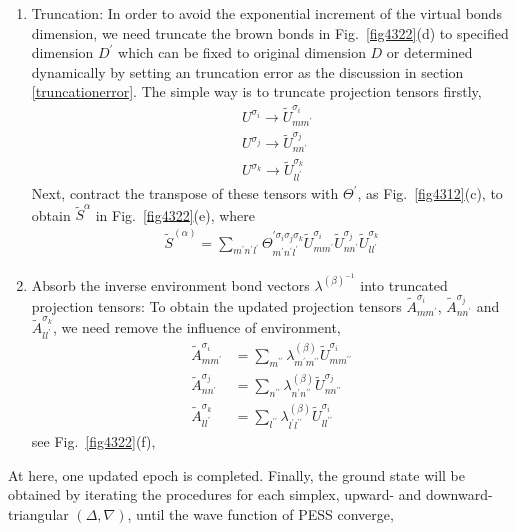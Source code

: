\begin{enumerate}
	\item Truncation: In order to avoid the exponential increment of the virtual bonds dimension, we need truncate the brown bonds in Fig.~\ref{fig4322}(d) to specified dimension $D^{\prime}$ which can be fixed to original dimension $D$ or determined dynamically by setting an truncation error as the discussion in section \ref{truncationerror}. The simple way is to truncate projection tensors firstly,  
		\begin{align}
			&U^{\sigma_i} \rightarrow \widetilde{U}^{\sigma_i}_{mm^{\prime}} \\
			&U^{\sigma_j} \rightarrow \widetilde{U}^{\sigma_j}_{nn^{\prime}} \\
			&U^{\sigma_k} \rightarrow \widetilde{U}^{\sigma_k}_{ll^{\prime}}
		\end{align}
		Next, contract the transpose of these tensors with $\Theta^{\prime}$, as Fig.~\ref{fig4312}(c), to obtain $\widetilde{S}^{\alpha}$ in Fig.~\ref{fig4322}(e), where
		\begin{align}
			\widetilde{S}^{(\alpha)} = \sum_{m^{\prime}n^{\prime}l^{\prime}}{\Theta_{m^{\prime} n^{\prime} l^{\prime}}^{\prime \sigma_i \sigma_j \sigma_k} \widetilde{U}^{\sigma_i}_{mm^{\prime}} \widetilde{U}^{\sigma_j}_{nn^{\prime}} \widetilde{U}^{\sigma_k}_{ll^{\prime}}}
		\end{align}
	\item Absorb the inverse environment bond vectors $\lambda^{(\beta)^{-1}}$ into truncated projection tensors: To obtain the updated projection tensors $\widetilde{A}^{\sigma_i}_{mm^{\prime}}$, $\widetilde{A}^{\sigma_j}_{nn^{\prime}}$ and $\widetilde{A}^{\sigma_k}_{ll^{\prime}}$, we need remove the influence of environment, 
		\begin{align}
			\widetilde{A}^{\sigma_i}_{mm^{\prime}} &= \sum_{m^{\prime \prime}}{ \lambda^{(\beta)}_{m^{\prime} m^{\prime \prime}} \widetilde{U}^{\sigma_i}_{mm^{\prime \prime}}} \\
			\widetilde{A}^{\sigma_j}_{nn^{\prime}} &= \sum_{n^{\prime \prime}}{ \lambda^{(\beta)}_{n^{\prime} n^{\prime \prime}} \widetilde{U}^{\sigma_j}_{nn^{\prime \prime}}} \\
			\widetilde{A}^{\sigma_k}_{ll^{\prime}} &= \sum_{l^{\prime \prime}}{ \lambda^{(\beta)}_{l^{\prime} l^{\prime \prime}} \widetilde{U}^{\sigma_i}_{ll^{\prime \prime}}}
		\end{align}	
		see Fig.~\ref{fig4322}(f),
\end{enumerate}

At here, one updated epoch is completed. Finally, the ground state will be obtained by iterating the procedures for each simplex, upward- and downward- triangular $(\Delta, \nabla)$, until the wave function of PESS converge, 
